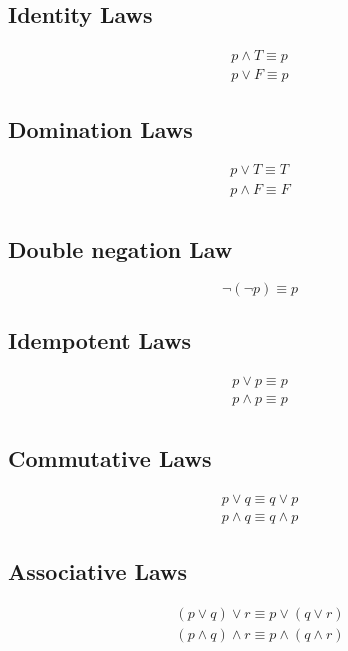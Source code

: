 \documentclass[12pt letter]{report}
\begin{document}
\subsection{Identity Laws}

\begin{align*}
	p \wedge T \equiv p \\
	p \vee F  \equiv p
\end{align*}

\subsection{Domination Laws}

\begin{align*}
	p \vee T \equiv T    \\
	p \wedge  F \equiv F \\
\end{align*}

\subsection{Double negation Law}

\[
	\neg \left( \neg p \right) \equiv p
\]

\subsection{Idempotent Laws}

\begin{align*}
	p \vee p  \equiv p  \\
	p \wedge p \equiv p \\
\end{align*}

\subsection{Commutative Laws}

\begin{align*}
	p \vee q \equiv q \vee p \\
	p \wedge q \equiv q \wedge p
\end{align*}

\subsection{Associative Laws}

\begin{align*}
	\left( p \vee q \right)  \vee  r \equiv p \vee \left( q \vee r \right) \\
	\left( p \wedge q \right) \wedge  r \equiv p \wedge \left( q \wedge r \right)
\end{align*}
\end{document}
